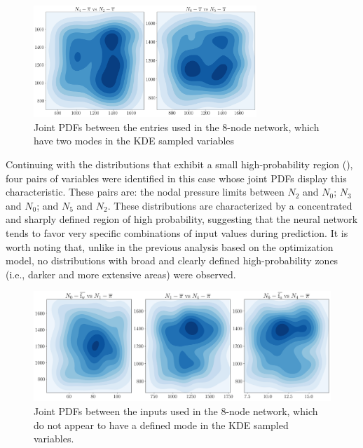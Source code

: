 \begin{figure}[htbp]
    \begin{center}
        \includegraphics[width=0.75\textwidth]{figures/Chapter_NonLinealCensnet/PDF_inputs_inputs (Sampled).png}
    \end{center}
    \caption{Joint PDFs between the entries used in the 8-node network, which have two modes in the KDE sampled variables}
    \label{fig:joint_distributions_input_input_KDE}
\end{figure}
     

Continuing with the distributions that exhibit a small high-probability region (), four pairs of variables were identified in this case whose joint PDFs display this characteristic. These pairs are: the nodal pressure limits between $N_2$ and $N_0$; $N_3$ and $N_0$; and $N_5$ and $N_2$. These distributions are characterized by a concentrated and sharply defined region of high probability, suggesting that the neural network tends to favor very specific combinations of input values during prediction. It is worth noting that, unlike in the previous analysis based on the optimization model, no distributions with broad and clearly defined high-probability zones (i.e., darker and more extensive areas) were observed.


\begin{figure}[htbp]
    \begin{center}
        \includegraphics[width=.75\textwidth]{figures/Chapter_NonLinealCensnet/PDF_inputs_inputs_no_mode (KDE).png}
    \end{center}
    \caption{Joint PDFs between the inputs used in the 8-node network, which do not appear to have a defined mode in the KDE sampled variables. }
    \label{fig:joint_distributions_input_input_no_mode_KDE}
\end{figure}


